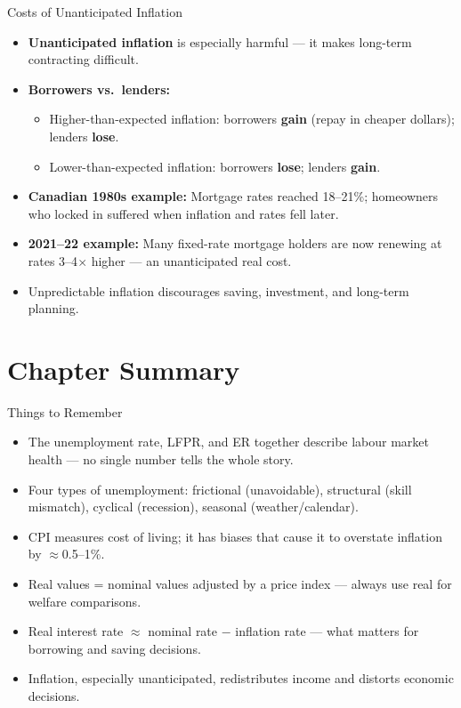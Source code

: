 \documentclass[aspectratio=169]{beamer}
\begin{document}
\begin{frame}{Costs of Unanticipated Inflation}
\transfade
\begin{itemize}[<+->]
  \item \textbf{Unanticipated inflation} is especially harmful --- it makes long-term contracting difficult.
  \item \textbf{Borrowers vs.\ lenders:}
  \begin{itemize}[<+->]
    \item Higher-than-expected inflation: borrowers \textbf{gain} (repay in cheaper dollars); lenders \textbf{lose}.
    \item Lower-than-expected inflation: borrowers \textbf{lose}; lenders \textbf{gain}.
  \end{itemize}
  \item \textbf{Canadian 1980s example:} Mortgage rates reached 18--21\%; homeowners who locked in suffered when inflation and rates fell later.
  \item \textbf{2021--22 example:} Many fixed-rate mortgage holders are now renewing at rates 3--4$\times$ higher --- an unanticipated real cost.
  \item Unpredictable inflation discourages saving, investment, and long-term planning.
\end{itemize}
\end{frame}

\section*{Chapter Summary}

\begin{frame}{Things to Remember}
\transfade
\begin{itemize}[<+->]
  \item The unemployment rate, LFPR, and ER together describe labour market health --- no single number tells the whole story.
  \item Four types of unemployment: frictional (unavoidable), structural (skill mismatch), cyclical (recession), seasonal (weather/calendar).
  \item CPI measures cost of living; it has biases that cause it to \alert{overstate} inflation by $\approx$0.5--1\%.
  \item Real values = nominal values adjusted by a price index --- always use real for welfare comparisons.
  \item Real interest rate $\approx$ nominal rate $-$ inflation rate --- what matters for borrowing and saving decisions.
  \item Inflation, especially unanticipated, redistributes income and distorts economic decisions.
\end{itemize}
\end{frame}
\end{document}
